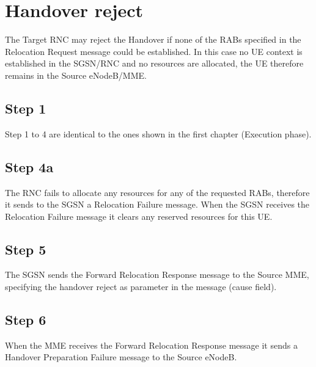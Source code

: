 \section{Handover reject}
The Target RNC may reject the Handover if none of the RABs specified in the
Relocation Request message could be established. In this case no UE context is
established in the SGSN/RNC and no resources are allocated, the UE therefore
remains in the Source eNodeB/MME.



\subsection*{Step 1}
Step 1 to 4 are identical to the ones shown in the first chapter (Execution phase).



\subsection*{Step 4a}
The RNC fails to allocate any resources for any of the requested RABs, therefore
it sends to the SGSN a Relocation Failure message. When the SGSN receives the
Relocation Failure message it clears any reserved resources for this UE.



\subsection*{Step 5}
The SGSN sends the Forward Relocation Response message to the Source MME, specifying
the handover reject as parameter in the message (cause field).



\subsection*{Step 6}
When the MME receives the Forward Relocation Response message it sends a Handover
Preparation Failure message to the Source eNodeB.
